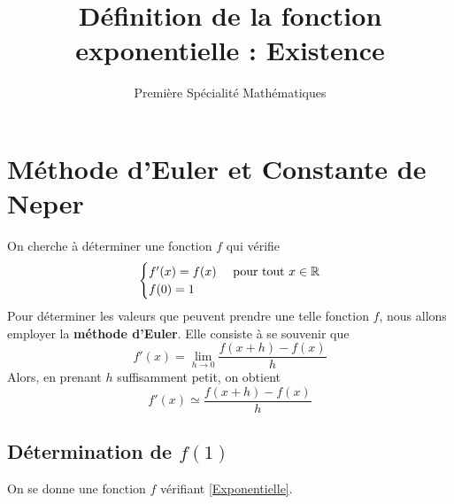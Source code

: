 \documentclass{exos}
\date{}
\author{Première Spécialité Mathématiques}
\begin{document}
\title{Définition de la fonction exponentielle : Existence}
\maketitle
\section{Méthode d'Euler et Constante de Neper}
On cherche à déterminer une fonction $f$ qui vérifie
\begin{equation}
\label{Exponentielle}
\begin{cases}
f'(x) = f(x)& \text{ pour tout } x \in \mathbb{R}\\
f(0) = 1
\end{cases}
\end{equation}
Pour déterminer les valeurs que peuvent prendre une telle fonction $f$, nous allons employer la \textbf{méthode d'Euler}. Elle consiste à se souvenir que
\begin{equation*}
f'(x) = \lim_{h \to 0} \dfrac{f(x + h) - f(x)}{h}
\end{equation*}
Alors, en prenant $h$ suffisamment petit, on obtient 
\begin{equation}
\label{Euler}
f'(x) \simeq \dfrac{f(x + h) - f(x)}{h} 
\end{equation}

\subsection{Détermination de $f(1)$}

On se donne une fonction $f$ vérifiant \eqref{Exponentielle}.
\end{document}
